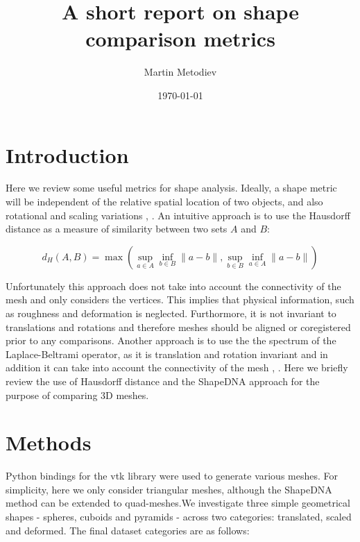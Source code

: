 \documentclass[11pt]{article}
\title{A short report on shape comparison metrics}
\author{Martin Metodiev}
\date{\today}
\begin{document}
\maketitle	




\section{Introduction}

Here we review some useful metrics for shape analysis. Ideally, a shape metric will be independent of the relative spatial location of two objects, and also rotational and scaling variations \cite{shapedna}, \cite{hyp_w}. An intuitive approach is to use the Hausdorff distance as a measure of similarity between two sets \( A \) and \( B \):

\begin{equation}
d_H(A, B) = \max \left( \sup_{a \in A} \inf_{b \in B} \| a - b \|, \sup_{b \in B} \inf_{a \in A} \| a - b \| \right)
\end{equation}


Unfortunately this approach does not take into account the connectivity of the mesh and only considers the vertices. This implies that physical information, such as roughness and deformation is neglected. Furthormore, it is not invariant to translations and rotations and therefore meshes should be aligned or coregistered prior to any comparisons. Another approach is to use the the spectrum of the Laplace-Beltrami operator, as it is translation and rotation invariant and in addition it can take into account the connectivity of the mesh \cite{shapedna}, \cite{laplace-beltrami}. Here we briefly review the use of Hausdorff distance and the ShapeDNA approach \cite{shapedna} for the purpose of comparing 3D meshes. 


\section{Methods}

Python bindings for the vtk library were used to generate various meshes. For simplicity, here we only consider triangular meshes, although the ShapeDNA method can be extended to quad-meshes.We investigate three simple geometrical shapes - spheres, cuboids and pyramids - across two categories: translated, scaled and deformed. The final dataset categories are as follows:
\end{document}
